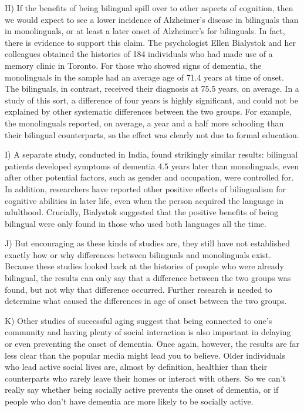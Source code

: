 \documentclass[UTF8,11pt]{ctexart}
\begin{document}
H) If the benefits of being bilingual spill over to other aspects of cognition, then we would expect to see a lower incidence of Alzheimer’s disease in bilinguals than in monolinguals, or at least a later onset of Alzheimer’s for bilinguals. In fact, there is evidence to support this claim. The psychologist Ellen Bialystok and her colleagues obtained the histories of 184 individuals who had made use of a memory clinic in Toronto. For those who showed signs of dementia, the monolinguals in the sample had an average age of 71.4 years at time of onset. The bilinguals, in contrast, received their diagnosis at 75.5 years, on average. In a study of this sort, a difference of four years is highly significant, and could not be explained by other systematic differences between the two groups. For example, the monolinguals reported, on average, a year and a half more schooling than their bilingual counterparts, so the effect was clearly not due to formal education.


I) A separate study, conducted in India, found strikingly similar results: bilingual patients developed symptoms of dementia 4.5 years later than monolinguals, even after other potential factors, such as gender and occupation, were controlled for. In addition, researchers have reported other positive effects of bilingualism for cognitive abilities in later life, even when the person acquired the language in adulthood. Crucially, Bialystok suggested that the positive benefits of being bilingual were only found in those who used both languages all the time.


J) But encouraging as these kinds of studies are, they still have not established exactly how or why differences between bilinguals and monolinguals exist. Because these studies looked back at the histories of people who were already bilingual, the results can only say that a difference between the two groups was found, but not why that difference occurred. Further research is needed to determine what caused the differences in age of onset between the two groups.


K) Other studies of successful aging suggest that being connected to one’s community and having plenty of social interaction is also important in delaying or even preventing the onset of dementia. Once again, however, the results are far less clear than the popular media might lead you to believe. Older individuals who lead active social lives are, almost by definition, healthier than their counterparts who rarely leave their homes or interact with others. So we can’t really say whether being socially active prevents the onset of dementia, or if people who don’t have dementia are more likely to be socially active.
\end{document}
